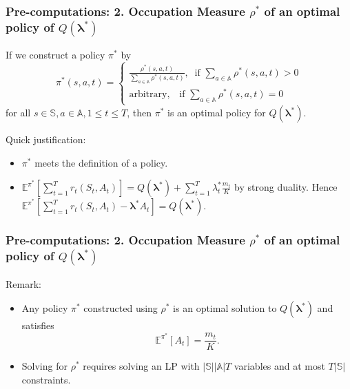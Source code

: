 \documentclass{beamer}
\newcommand{\lambdav}{\pmb{\lambda}}
\newcommand{\subp}{\pi}
\newcommand{\substates}{\mathbb{S}}
\newcommand{\subactions}{\mathbb{A}}
\newcommand{\subaction}{a}
\begin{document}
\begin{frame}
\frametitle{Pre-computations: 2. Occupation Measure $\rho^*$ of an optimal policy of $Q(\lambdav^*)$}
\begin{Lemma}\label{th:exist}
If we construct a policy $\pi^*$ by
\begin{equation}\label{df:rho}
\subp^{*}(s,a,t)=
\begin{cases}
\frac{\rho^*(s,a,t)}{\sum_{a\in\subactions}\rho^*(s,a,t)},\; \; \text{if }\sum_{a\in\subactions}\rho^*(s,a,t)>0\\
\text{arbitrary}, \;\;\;\text{if }\sum_{a\in\subactions}\rho^*(s,a,t)=0 
\end{cases}
\end{equation}for all $s\in \substates,\subaction\in\subactions,1\leq t\leq T$, then $\pi^*$ is an optimal policy for $Q(\lambdav^*)$.
\end{Lemma}
Quick justification: 
\begin{itemize}
\item $\pi^*$ meets the definition of a policy.
\item $\mathbb{E}^{\pi^*}[\sum_{t=1}^Tr_t(S_t,A_t)] = Q(\lambdav^*)+\sum_{t=1}^{T}\lambda_t^*\frac{m_t}{K}$ by strong duality. Hence $\mathbb{E}^{\pi^*}[\sum_{t=1}^Tr_t(S_t,A_t)-\lambdav^*A_t] = Q(\lambdav^*)$.
\end{itemize}

\end{frame}

\begin{frame}
\frametitle{Pre-computations: 2. Occupation Measure $\rho^*$ of an optimal policy of $Q(\lambdav^*)$}
Remark: 
\begin{itemize}
\item Any policy $\pi^*$ constructed using $\rho^*$ is an optimal solution to $Q(\lambdav^*)$ and satisfies
\begin{equation}
\mathbb{E}^{\pi^*}[A_t]=\frac{m_t}{K}.
\end{equation} 
\item Solving for $\rho^*$ requires solving an LP with $|\substates||\subactions|T$ variables and at most $T|\substates|$ constraints.
\end{itemize}
\end{frame}
\end{document}
